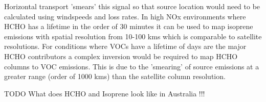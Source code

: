 Horizontal transport 'smears' this signal so that source location would need to be calculated using windspeeds and loss rates.
In high NOx environments where HCHO has a lifetime in the order of 30 minutes it can be used to map isoprene emissions with spatial resolution from 10-100 kms which is comparable to satellite resolutions.
For conditions where VOCs have a lifetime of days are the major HCHO contributors a complex inversion would be required to map HCHO columns to VOC emissions.
This is due to the 'smearing' of source emissions at a greater range (order of 1000 kms) than the satellite column resolution.

TODO What does HCHO and Isoprene look like in Australia !!!